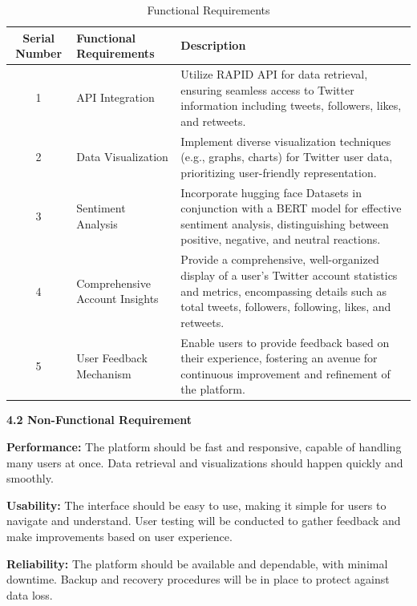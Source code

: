 \documentclass[a4paper,12pt]{article}
\begin{document}
{{{ \begin{table}[h] 
\caption{Functional Requirements}
  \begin{center}
  \label{table}
\begin{tabular}{|c|p{5cm}|p{6cm}|}
\hline
\textbf{Serial Number} & \textbf{Functional Requirements} & \textbf{Description} \\
\hline
1 & API Integration & Utilize RAPID API for data retrieval, ensuring seamless access to Twitter information including tweets, followers, likes, and retweets. \\
\hline
2 & Data Visualization & Implement diverse visualization techniques (e.g., graphs, charts) for Twitter user data, prioritizing user-friendly representation. \\
\hline
3 & Sentiment Analysis & Incorporate hugging face Datasets in conjunction with a BERT model for effective sentiment analysis, distinguishing between positive, negative, and neutral reactions. \\
\hline
4 & Comprehensive Account Insights & Provide a comprehensive, well-organized display of a user's Twitter account statistics and metrics, encompassing details such as total tweets, followers, following, likes, and retweets. \\
\hline
5 & User Feedback Mechanism & Enable users to provide feedback based on their experience, fostering an avenue for continuous improvement and refinement of the platform. \\
\hline
\end{tabular}
\end{center}
\end{table}


 \newpage
 
\begin{flushleft}
			\fontsize{13}{15}\selectfont\textbf{4.2 Non-Functional Requirement}
			\label{nonfun}
		\end{flushleft}

  \textbf{Performance:} The platform should be fast and responsive, capable of handling many users at once. Data retrieval and visualizations should happen quickly and smoothly.

\textbf{Usability:} The interface should be easy to use, making it simple for users to navigate and understand. User testing will be conducted to gather feedback and make improvements based on user experience.

\textbf{Reliability:} The platform should be available and dependable, with minimal downtime. Backup and recovery procedures will be in place to protect against data loss.

}}}
\end{document}
